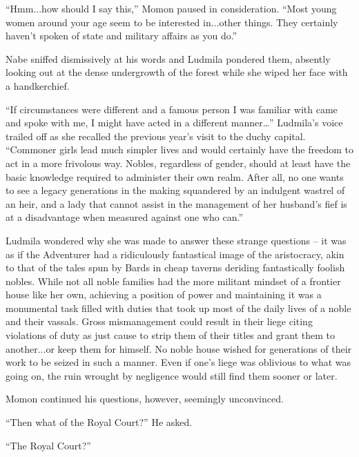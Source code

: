 “Hmm...how should I say this,” Momon paused in consideration. “Most young women around your age seem to be interested in...other things. They certainly haven’t spoken of state and military affairs as you do.”

 

Nabe sniffed dismissively at his words and Ludmila pondered them, absently looking out at the dense undergrowth of the forest while she wiped her face with a handkerchief.

 

“If circumstances were different and a famous person I was familiar with came and spoke with me, I might have acted in a different manner…” Ludmila's voice trailed off as she recalled the previous year's visit to the duchy capital. “Commoner girls lead much simpler lives and would certainly have the freedom to act in a more frivolous way. Nobles, regardless of gender, should at least have the basic knowledge required to administer their own realm. After all, no one wants to see a legacy generations in the making squandered by an indulgent wastrel of an heir, and a lady that cannot assist in the management of her husband’s fief is at a disadvantage when measured against one who can.”

 

Ludmila wondered why she was made to answer these strange questions – it was as if the Adventurer had a ridiculously fantastical image of the aristocracy, akin to that of the tales spun by Bards in cheap taverns deriding fantastically foolish nobles. While not all noble families had the more militant mindset of a frontier house like her own, achieving a position of power and maintaining it was a monumental task filled with duties that took up most of the daily lives of a noble and their vassals. Gross mismanagement could result in their liege citing violations of duty as just cause to strip them of their titles and grant them to another...or keep them for himself. No noble house wished for generations of their work to be seized in such a manner. Even if one’s liege was oblivious to what was going on, the ruin wrought by negligence would still find them sooner or later.

 

Momon continued his questions, however, seemingly unconvinced.

 

“Then what of the Royal Court?” He asked.

 

“The Royal Court?”

